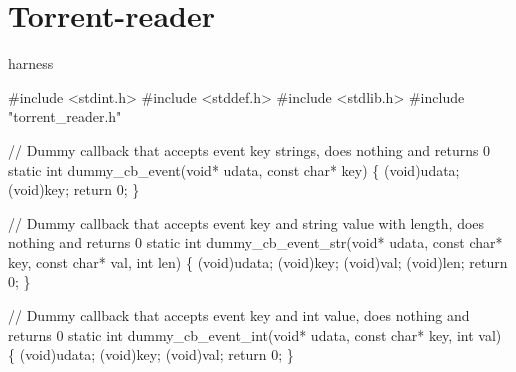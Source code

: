 \documentclass[
  a4paper,
]{scrreprt}
\newenvironment{Shaded}{\begin{snugshade}}{\end{snugshade}}
\newcommand{\CommentTok}[1]{\textcolor[rgb]{0.41,0.41,0.41}{#1}}
\newcommand{\ControlFlowTok}[1]{\textcolor[rgb]{0.85,0.12,0.09}{#1}}
\newcommand{\DataTypeTok}[1]{\textcolor[rgb]{0.47,0.16,0.63}{#1}}
\newcommand{\DecValTok}[1]{\textcolor[rgb]{0.47,0.16,0.63}{#1}}
\newcommand{\ImportTok}[1]{\textcolor[rgb]{0.33,0.33,0.33}{#1}}
\newcommand{\NormalTok}[1]{\textcolor[rgb]{0.33,0.33,0.33}{#1}}
\newcommand{\OperatorTok}[1]{\textcolor[rgb]{0.00,0.46,0.62}{#1}}
\newcommand{\PreprocessorTok}[1]{\textcolor[rgb]{0.47,0.16,0.63}{#1}}
\theoremstyle{definition}
\theoremstyle{remark}
\begin{document}
\section{Torrent-reader}\label{torrent-reader}

harness

\begin{Shaded}
\begin{Highlighting}[numbers=left,,]
\PreprocessorTok{\#include }\ImportTok{\textless{}stdint.h\textgreater{}}
\PreprocessorTok{\#include }\ImportTok{\textless{}stddef.h\textgreater{}}
\PreprocessorTok{\#include }\ImportTok{\textless{}stdlib.h\textgreater{}}
\PreprocessorTok{\#include }\ImportTok{"torrent\_reader.h"}

\CommentTok{// Dummy callback that accepts event key strings, does nothing and returns 0}
\DataTypeTok{static} \DataTypeTok{int}\NormalTok{ dummy\_cb\_event}\OperatorTok{(}\DataTypeTok{void}\OperatorTok{*}\NormalTok{ udata}\OperatorTok{,} \DataTypeTok{const} \DataTypeTok{char}\OperatorTok{*}\NormalTok{ key}\OperatorTok{)} \OperatorTok{\{}
    \OperatorTok{(}\DataTypeTok{void}\OperatorTok{)}\NormalTok{udata}\OperatorTok{;}
    \OperatorTok{(}\DataTypeTok{void}\OperatorTok{)}\NormalTok{key}\OperatorTok{;}
    \ControlFlowTok{return} \DecValTok{0}\OperatorTok{;}
\OperatorTok{\}}

\CommentTok{// Dummy callback that accepts event key and string value with length, does nothing and returns 0}
\DataTypeTok{static} \DataTypeTok{int}\NormalTok{ dummy\_cb\_event\_str}\OperatorTok{(}\DataTypeTok{void}\OperatorTok{*}\NormalTok{ udata}\OperatorTok{,} \DataTypeTok{const} \DataTypeTok{char}\OperatorTok{*}\NormalTok{ key}\OperatorTok{,} \DataTypeTok{const} \DataTypeTok{char}\OperatorTok{*}\NormalTok{ val}\OperatorTok{,} \DataTypeTok{int}\NormalTok{ len}\OperatorTok{)} \OperatorTok{\{}
    \OperatorTok{(}\DataTypeTok{void}\OperatorTok{)}\NormalTok{udata}\OperatorTok{;}
    \OperatorTok{(}\DataTypeTok{void}\OperatorTok{)}\NormalTok{key}\OperatorTok{;}
    \OperatorTok{(}\DataTypeTok{void}\OperatorTok{)}\NormalTok{val}\OperatorTok{;}
    \OperatorTok{(}\DataTypeTok{void}\OperatorTok{)}\NormalTok{len}\OperatorTok{;}
    \ControlFlowTok{return} \DecValTok{0}\OperatorTok{;}
\OperatorTok{\}}

\CommentTok{// Dummy callback that accepts event key and int value, does nothing and returns 0}
\DataTypeTok{static} \DataTypeTok{int}\NormalTok{ dummy\_cb\_event\_int}\OperatorTok{(}\DataTypeTok{void}\OperatorTok{*}\NormalTok{ udata}\OperatorTok{,} \DataTypeTok{const} \DataTypeTok{char}\OperatorTok{*}\NormalTok{ key}\OperatorTok{,} \DataTypeTok{int}\NormalTok{ val}\OperatorTok{)} \OperatorTok{\{}
    \OperatorTok{(}\DataTypeTok{void}\OperatorTok{)}\NormalTok{udata}\OperatorTok{;}
    \OperatorTok{(}\DataTypeTok{void}\OperatorTok{)}\NormalTok{key}\OperatorTok{;}
    \OperatorTok{(}\DataTypeTok{void}\OperatorTok{)}\NormalTok{val}\OperatorTok{;}
    \ControlFlowTok{return} \DecValTok{0}\OperatorTok{;}
\OperatorTok{\}}


\end{Highlighting}
\end{Shaded}
\end{document}
